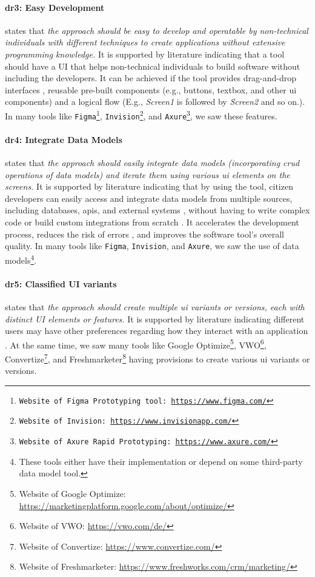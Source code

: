 \paragraph{\ac{dr}3: Easy Development} states that \textit{the approach should be easy to develop and operatable by non-technical individuals with different techniques to create applications without extensive programming knowledge.}
It is supported by literature indicating that a tool should have a UI that helps non-technical individuals to build software without including the developers. 
It can be achieved if the tool provides drag-and-drop interfaces \cite{article:nocode:miller}, reusable pre-built components \cite{article:prototyping:lowcode} (e.g., buttons, textbox, and other \ac{ui} components) and a logical flow (E.g., \textit{Screen1} is followed by \textit{Screen2} and so on.). 
In many tools like \texttt{Figma\footnote{Website of Figma Prototyping tool: \url{https://www.figma.com/}}}, \texttt{Invision\footnote{Website of Invision: \url{https://www.invisionapp.com/}}}, and \texttt{Axure\footnote{Website of Axure Rapid Prototyping: \url{https://www.axure.com/}}}, we saw these features.

\paragraph{\ac{dr}4: Integrate Data Models} states that \textit{the approach should easily integrate data models (incorporating \ac{crud} operations of data models) and iterate them using various \ac{ui} elements on the screens.} 
It is supported by literature indicating that by using the tool, citizen developers can easily access and integrate data models from multiple sources, including databases, \ac{api}s, and external systems \cite{paper:lowcode:khorram}, without having to write complex code or build custom integrations from scratch \cite{article:lowcode:modeldriven}.
It accelerates the development process, reduces the risk of errors \cite{misc:lowcode:platforms}, and improves the software tool's overall quality.
In many tools like \texttt{Figma}, \texttt{Invision}, and \texttt{Axure}, we saw the use of data models\footnote{These tools either have their implementation or depend on some third-party data model tool.}.

\paragraph{\ac{dr}5: Classified UI variants} states that \textit{the approach should create multiple \ac{ui} variants or versions, each with distinct UI elements or features.}
It is supported by literature indicating different users may have other preferences regarding how they interact with an application \cite{article:swdemand:ahmed}.
At the same time, we saw many tools like Google Optimize\footnote{Website of Google Optimize: \url{https://marketingplatform.google.com/about/optimize/}}, VWO\footnote{Website of VWO: \url{https://vwo.com/de/}}, Convertize\footnote{Website of Convertize: \url{https://www.convertize.com/}}, and Freshmarketer\footnote{Website of Freshmarketer: \url{https://www.freshworks.com/crm/marketing/}} having provisions to create various \ac{ui} variants or versions.

